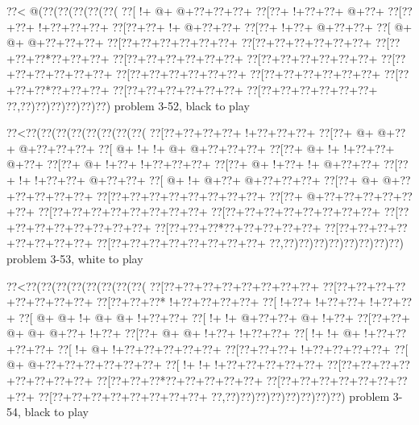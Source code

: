 \vbox{\vbox{\goo
\0??<\- @(\0??(\0??(\0??(\0??(\0??(
\0??[\- !+\- @+\- @+\0??+\0??+\0??+
\0??[\0??+\- !+\0??+\0??+\- @+\0??+
\0??[\0??+\0??+\- !+\0??+\0??+\0??+
\0??[\0??+\0??+\- !+\- @+\0??+\0??+
\0??[\0??+\- !+\0??+\- @+\0??+\0??+
\0??[\- @+\- @+\- @+\0??+\0??+\0??+
\0??[\0??+\0??+\0??+\0??+\0??+\0??+
\0??[\0??+\0??+\0??+\0??+\0??+\0??+
\0??[\0??+\0??+\0??*\0??+\0??+\0??+
\0??[\0??+\0??+\0??+\0??+\0??+\0??+
\0??[\0??+\0??+\0??+\0??+\0??+\0??+
\0??[\0??+\0??+\0??+\0??+\0??+\0??+
\0??[\0??+\0??+\0??+\0??+\0??+\0??+
\0??[\0??+\0??+\0??+\0??+\0??+\0??+
\0??[\0??+\0??+\0??*\0??+\0??+\0??+
\0??[\0??+\0??+\0??+\0??+\0??+\0??+
\0??[\0??+\0??+\0??+\0??+\0??+\0??+
\0??,\0??)\0??)\0??)\0??)\0??)\0??)
}
\hfil problem 3-52, black to play\hfil\break
}

\vbox{\vbox{\goo
\0??<\0??(\0??(\0??(\0??(\0??(\0??(\0??(\0??(
\0??[\0??+\0??+\0??+\0??+\- !+\0??+\0??+\0??+
\0??[\0??+\- @+\- @+\0??+\- @+\0??+\0??+\0??+
\0??[\- @+\- !+\- !+\- @+\- @+\0??+\0??+\0??+
\0??[\0??+\- @+\- !+\- !+\0??+\0??+\- @+\0??+
\0??[\0??+\- @+\- !+\0??+\- !+\0??+\0??+\0??+
\0??[\0??+\- @+\- !+\0??+\- !+\- @+\0??+\0??+
\0??[\0??+\- !+\- !+\0??+\0??+\- @+\0??+\0??+
\0??[\- @+\- !+\- @+\0??+\- @+\0??+\0??+\0??+
\0??[\0??+\- @+\- @+\0??+\0??+\0??+\0??+\0??+
\0??[\0??+\0??+\0??+\0??+\0??+\0??+\0??+\0??+
\0??[\0??+\- @+\0??+\0??+\0??+\0??+\0??+\0??+
\0??[\0??+\0??+\0??+\0??+\0??+\0??+\0??+\0??+
\0??[\0??+\0??+\0??+\0??+\0??+\0??+\0??+\0??+
\0??[\0??+\0??+\0??+\0??+\0??+\0??+\0??+\0??+
\0??[\0??+\0??+\0??*\0??+\0??+\0??+\0??+\0??+
\0??[\0??+\0??+\0??+\0??+\0??+\0??+\0??+\0??+
\0??[\0??+\0??+\0??+\0??+\0??+\0??+\0??+\0??+
\0??,\0??)\0??)\0??)\0??)\0??)\0??)\0??)\0??)
}
\hfil problem 3-53, white to play\hfil\break
}

\vbox{\vbox{\goo
\0??<\0??(\0??(\0??(\0??(\0??(\0??(\0??(\0??(
\0??[\0??+\0??+\0??+\0??+\0??+\0??+\0??+\0??+
\0??[\0??+\0??+\0??+\0??+\0??+\0??+\0??+\0??+
\0??[\0??+\0??+\0??*\- !+\0??+\0??+\0??+\0??+
\0??[\- !+\0??+\- !+\0??+\0??+\- !+\0??+\0??+
\0??[\- @+\- @+\- !+\- @+\- @+\- !+\0??+\0??+
\0??[\- !+\- !+\- @+\0??+\0??+\- @+\- !+\0??+
\0??[\0??+\0??+\- @+\- @+\- @+\0??+\- !+\0??+
\0??[\0??+\- @+\- @+\- !+\0??+\- !+\0??+\0??+
\0??[\- !+\- !+\- @+\- !+\0??+\0??+\0??+\0??+
\0??[\- !+\- @+\- !+\0??+\0??+\0??+\0??+\0??+
\0??[\0??+\0??+\0??+\- !+\0??+\0??+\0??+\0??+
\0??[\- @+\- @+\0??+\0??+\0??+\0??+\0??+\0??+
\0??[\- !+\- !+\- !+\0??+\0??+\0??+\0??+\0??+
\0??[\0??+\0??+\0??+\0??+\0??+\0??+\0??+\0??+
\0??[\0??+\0??+\0??*\0??+\0??+\0??+\0??+\0??+
\0??[\0??+\0??+\0??+\0??+\0??+\0??+\0??+\0??+
\0??[\0??+\0??+\0??+\0??+\0??+\0??+\0??+\0??+
\0??,\0??)\0??)\0??)\0??)\0??)\0??)\0??)\0??)
}
\hfil problem 3-54, black to play\hfil\break
}


